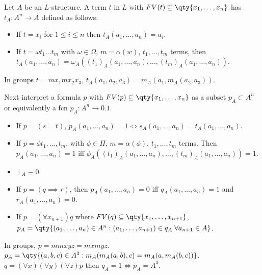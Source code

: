 Let $A$ be an $L$-structure.
A term $t$ in $L$ with $FV(t) \subseteq \qty{x_1, \dots, x_n}$ has  $t_A : A^n \to A$ defined as follows:
\begin{itemize}
    \item If $t = x_i$ for $1 \leq i \leq n$ then $t_A(a_1, \dots, a_n) = a_i$.
    \item If $t = \omega t_1 \dots t_m$ with $\omega \in \Omega$, $m = \alpha(w)$, $t_1, \dots, t_m$ terms, then $t_A(a_1, \dots, a_n) = \omega_A((t_1)_A (a_1, \dots, a_n), \dots, (t_m)_A (a_1, \dots, a_n))$.
\end{itemize}

\begin{example}
    In groups $t = m x_1 m x_2 x_3$, $t_A(a_1, a_2, a_3) = m_A(a_1, m_A(a_2, a_3))$.
\end{example}

Next interpret a formula $p$ with $FV(p) \subseteq \qty{x_1, \dots, x_n}$ as a subset $p_A \subset A^n$ or equivalently a fcn $p_A : A^n \to \qty{0, 1}$.
\begin{itemize}
    \item If $p = (s = t)$, $p_A(a_1, \dots, a_n) = 1 \iff s_A(a_1, \dots, a_n) = t_A(a_1, \dots, a_n)$.
    \item If $p = \phi t_1, \dots, t_m$, with $\phi \in \Pi$, $m = \alpha(\phi)$, $t_1, \dots, t_m$ terms.
    Then $p_A(a_1, \dots, a_n) = 1$ iff $\phi_A((t_1)_A(a_1, \dots, a_n), \dots, (t_m)_A(a_1, \dots, a_n)) = 1$.
    \item $\bot_A \equiv 0$.
    \item If $p = (q \implies r)$, then $p_A(a_1, \dots, a_n) = 0$ iff $q_A(a_1, \dots, a_n) = 1$ and $r_A(a_1, \dots, a_n) = 0$.
    \item If $p = (\forall x_{n+1}) q$ where $FV(q) \subseteq \qty{x_1, \dots, x_{n+1}}$, \\
    $p_A = \qty{(a_1, \dots, a_n) \in A^n : (a_1, \dots, a_{n+1}) \in q_A \; \forall a_{n + 1} \in A}$.
\end{itemize}

\begin{example}
    In groups, $p = mm xyz = mx myz$. \\
    $p_A = \qty{(a, b, c) \in A^3 : m_A(m_A(a, b), c) = m_A(a, m_A(b, c))}$. \\
    $q = (\forall x) (\forall y) (\forall z) p$ then $q_A = 1 \iff p_A = A^3$.
\end{example}


